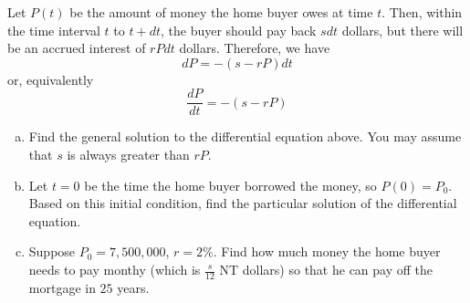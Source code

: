 \documentclass[11pt,letterpaper]{article}
\begin{document}
Let $P(t)$ be the amount of money the home buyer owes at time $t$.  Then, within the time interval $t$ to $t+dt$,  the buyer should pay back $sdt$ dollars, but there will be an accrued interest of $rPdt$ dollars.  Therefore, we have
\[dP = -(s-rP)dt\]
or, equivalently
\[\frac{dP}{dt} = -(s-rP)\]
\begin{enumerate}[a)]
	\item Find the general solution to the differential equation above.  You may assume that $s$ is always greater than $rP$.
	\item Let $t = 0$ be the time the home buyer borrowed the money, so $P(0) = P_0$.  Based on this initial condition, find the particular solution of the differential equation.
	\item Suppose $P_0 = 7,500,000$, $r = 2\%$.  Find how much money the home buyer needs to pay monthy (which is $\frac{s}{12}$ NT dollars) so that he can pay off the mortgage in $25$ years. 
\end{enumerate}
\end{document}
